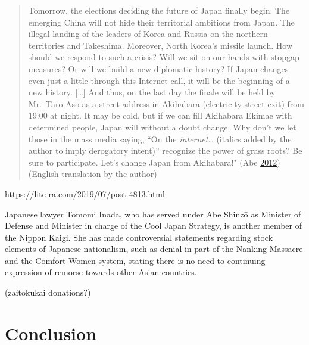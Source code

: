 \documentclass[10pt,british,A4paper,,openany]{memoir}
\begin{document}
\begin{quote}
Tomorrow, the elections deciding the future of Japan finally begin. The
emerging China will not hide their territorial ambitions from Japan. The
illegal landing of the leaders of Korea and Russia on the northern
territories and Takeshima. Moreover, North Korea's missile launch. How
should we respond to such a crisis? Will we sit on our hands with
stopgap measures? Or will we build a new diplomatic history? If Japan
changes even just a little through this Internet call, it will be the
beginning of a new history. {[}\ldots{}{]} And thus, on the last day the
finale will be held by Mr.~Taro Aso as a street address in Akihabara
(electricity street exit) from 19:00 at night. It may be cold, but if we
can fill Akihabara Ekimae with determined people, Japan will without a
doubt change. Why don't we let those in the mass media saying, ``On the
\emph{internet}\ldots{} (italics added by the author to imply derogatory
intent)'' recognize the power of grass roots? Be sure to participate.
Let's change Japan from Akihabara!" (Abe
\protect\hyperlink{ref-abe_1_2012}{2012}) (English translation by the
author)
\end{quote}

https://lite-ra.com/2019/07/post-4813.html

Japanese lawyer Tomomi Inada, who has served under Abe Shinzō as
Minister of Defense and Minister in charge of the Cool Japan Strategy,
is another member of the Nippon Kaigi. She has made controversial
statements regarding stock elements of Japanese nationalism, such as
denial in part of the Nanking Massacre and the Comfort Women system,
stating there is no need to continuing expression of remorse towards
other Asian countries.

(zaitokukai donations?)

\section{Conclusion}\label{conclusion}
\end{document}
